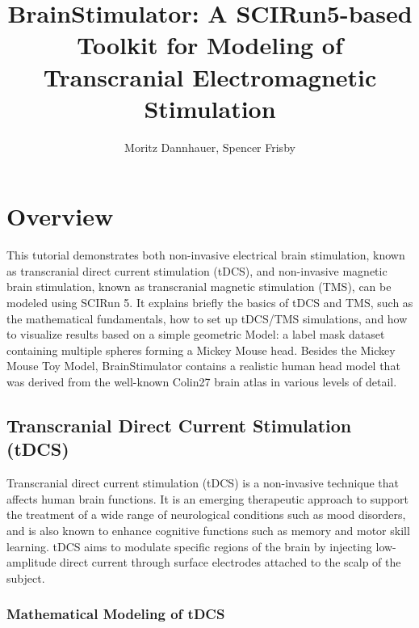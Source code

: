 \documentclass[fleqn,11pt,openany]{book}
\title{BrainStimulator: A SCIRun5-based Toolkit for Modeling of Transcranial Electromagnetic Stimulation}
\author{Moritz Dannhauer, Spencer Frisby}
\begin{document}

\maketitle


\chapter{Overview}

\begin{introduction}

This tutorial demonstrates both non-invasive electrical brain stimulation, known as transcranial direct current stimulation (tDCS), and non-invasive magnetic brain stimulation, known as transcranial magnetic stimulation (TMS), can be
modeled using SCIRun 5. It explains briefly the basics of tDCS and TMS, such as the mathematical fundamentals, how to set up tDCS/TMS simulations,
and how to visualize results based on a simple geometric Model: a label mask dataset containing multiple spheres forming a Mickey Mouse head.
Besides the Mickey Mouse Toy Model, BrainStimulator contains a realistic human head model that was derived from the well-known Colin27 brain atlas in various levels of detail. 

\end{introduction}

\section{Transcranial Direct Current Stimulation (tDCS)}

Transcranial direct current stimulation (tDCS) is a non-invasive technique that affects human brain functions.
It is an emerging therapeutic approach to support the treatment of a wide range of neurological conditions such as mood disorders, and is also known to enhance cognitive functions such as memory and motor skill learning.
tDCS aims to modulate specific regions of the brain by injecting low-amplitude direct current through surface electrodes attached to the scalp of the subject.

\subsection{Mathematical Modeling of tDCS}
\end{document}
